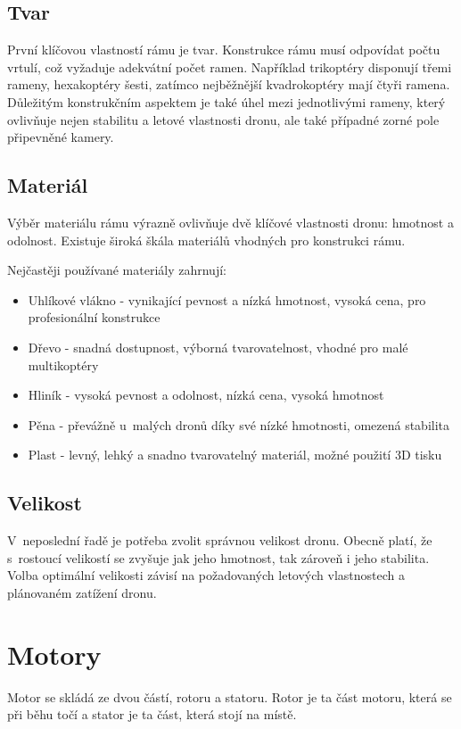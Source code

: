 \documentclass[12pt]{report}
\begin{document}
\subsection[Tvar]{Tvar}
První klíčovou vlastností rámu je tvar. Konstrukce rámu musí odpovídat počtu vrtulí, což vyžaduje adekvátní počet ramen. Například trikoptéry disponují třemi rameny, hexakoptéry šesti, zatímco nejběžnější kvadrokoptéry mají čtyři ramena. Důležitým konstrukčním aspektem je také úhel mezi jednotlivými rameny, který ovlivňuje nejen stabilitu a letové vlastnosti dronu, ale také případné zorné pole připevněné kamery.

\subsection[Materiál]{Materiál}
Výběr materiálu rámu výrazně ovlivňuje dvě klíčové vlastnosti dronu: hmotnost a odolnost. Existuje široká škála materiálů vhodných pro konstrukci rámu.

Nejčastěji používané materiály zahrnují:
\begin{itemize}
	\item Uhlíkové vlákno - vynikající pevnost a nízká hmotnost, vysoká cena, pro profesionální konstrukce
	\item Dřevo - snadná dostupnost, výborná tvarovatelnost, vhodné pro malé multikoptéry
	\item Hliník - vysoká pevnost a odolnost, nízká cena, vysoká hmotnost
	\item Pěna - převážně u~malých dronů díky své nízké hmotnosti, omezená stabilita
	\item Plast - levný, lehký a snadno tvarovatelný materiál, možné použití 3D tisku
\end{itemize}

\subsection[Velikost]{Velikost}
V~neposlední řadě je potřeba zvolit správnou velikost dronu. Obecně platí, že s~rostoucí velikostí se zvyšuje jak jeho hmotnost, tak zároveň i jeho stabilita. Volba optimální velikosti závisí na požadovaných letových vlastnostech a plánovaném zatížení dronu. \cite{mainbook} \cite{dojo} \cite{ultimateguide}

\section[Motory]{Motory}
Motor se skládá ze dvou částí, rotoru a statoru. Rotor je ta část motoru, která se při běhu točí a stator je ta část, která stojí na místě.
\end{document}
